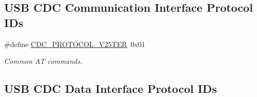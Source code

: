 \subsection*{\-U\-S\-B \-C\-D\-C \-Communication \-Interface \-Protocol \-I\-Ds}
\begin{DoxyCompactItemize}
\item 
\#define \hyperlink{group__cdc__protocol__group_ga987e4a1ebce34edcea106094d6241032}{\-C\-D\-C\-\_\-\-P\-R\-O\-T\-O\-C\-O\-L\-\_\-\-V25\-T\-E\-R}~0x01
\begin{DoxyCompactList}\small\item\em \-Common \-A\-T commands. \end{DoxyCompactList}\end{DoxyCompactItemize}
\subsection*{\-U\-S\-B \-C\-D\-C \-Data \-Interface \-Protocol \-I\-Ds}
